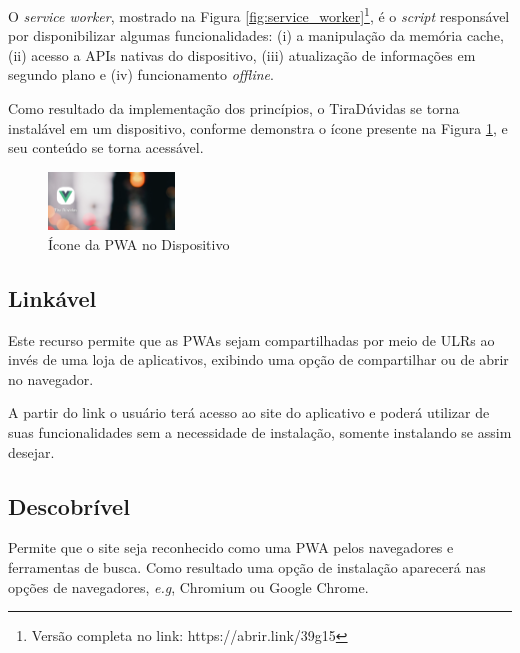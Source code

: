 \documentclass[12pt]{article}
\begin{document}
O \textit{service worker}, mostrado na Figura \ref{fig:service_worker}\footnote{Versão completa no link: https://abrir.link/39g15}, é o \textit{script} responsável por disponibilizar algumas funcionalidades: (i) a manipulação da memória cache, (ii) acesso a APIs nativas do dispositivo, (iii) atualização de informações em segundo plano e (iv) funcionamento \textit{offline}. 

Como resultado da implementação dos princípios, o TiraDúvidas se torna instalável em um dispositivo, conforme demonstra o ícone presente na Figura \ref{fig:instalavel}, e seu conteúdo se torna acessável.

\begin{figure}[ht!]
\centering
\includegraphics[width=0.3\textwidth]{imagens/instalavel.png}
\caption{Ícone da PWA no Dispositivo}
\label{fig:instalavel}
\end{figure}

\subsection{Linkável} \label{sec:linkavel}

Este recurso permite que as PWAs sejam compartilhadas por meio de ULRs ao invés de uma loja de aplicativos, exibindo uma opção de compartilhar ou de abrir no navegador.

A partir do link o usuário terá acesso ao site do aplicativo e poderá utilizar de suas funcionalidades sem a necessidade de instalação, somente instalando se assim desejar.


\subsection{Descobrível} \label{sec:descobrivel}

Permite que o site seja reconhecido como uma PWA pelos navegadores e ferramentas de busca. Como resultado uma opção de instalação aparecerá nas opções de navegadores, \textit{e.g}, Chromium ou Google Chrome.
\end{document}
